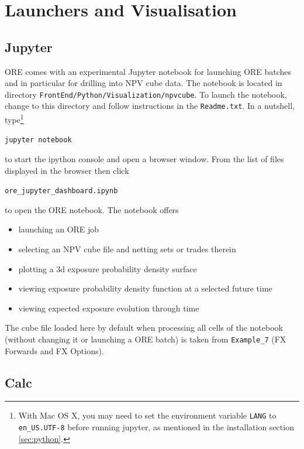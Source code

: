 \documentclass[12pt, a4paper]{article}
\begin{document}
{\section{Launchers and Visualisation}\label{sec:visualisation}

\subsection{Jupyter}\label{sec:jupyter}

ORE comes with an experimental Jupyter notebook for launching ORE batches and in particular for drilling into NPV cube
data.  The notebook is located in directory {\tt FrontEnd/Python/Visualization/npvcube}. To launch the notebook, change
to this directory and follow instructions in the {\tt Readme.txt}. In a nutshell, type\footnote{With Mac OS X, you may
  need to set the environment variable {\tt LANG} to {\tt en\_US.UTF-8} before running jupyter, as mentioned in the
  installation section \ref{sec:python}.}

\medskip
\centerline{\tt jupyter notebook}
\medskip

to start the ipython console and open a browser window. From the list of files displayed in the browser then click

\medskip
\centerline{\tt ore\_jupyter\_dashboard.ipynb} 
\medskip

to open the ORE notebook. The notebook offers
\begin{itemize}
\item launching an ORE job
\item selecting an NPV cube file and netting sets or trades therein
\item plotting a 3d exposure probability density surface
\item viewing exposure probability density function at a selected future time
\item viewing expected exposure evolution through time  
\end{itemize}

The cube file loaded here by default when processing all cells of the notebook (without changing it or launching a ORE
batch) is taken from {\tt Example\_7} (FX Forwards and FX Options).


\subsection{Calc}\label{sec:calc}

}
\end{document}
